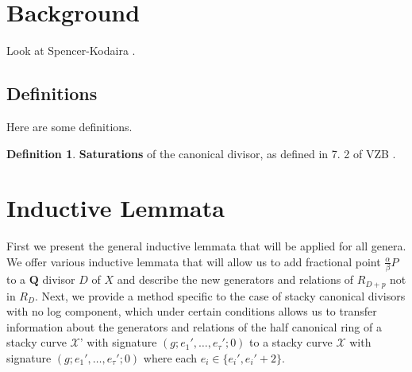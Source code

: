 \documentclass{amsart}
\theoremstyle{plain}
\theoremstyle{definition}
\newtheorem{defn}[thm]{Definition}
\theoremstyle{remark}
\numberwithin{equation}{section}
\newcommand \sx{\mathscr X}
\begin{document}












\section{Background}
Look at Spencer-Kodaira \cite{kodaira:complex-manifolds}.

\subsection{Definitions}
Here are some definitions.

\begin{defn}
\label{defn:sat}
\textbf{Saturations} of the canonical divisor, as defined in 7.
2 of VZB \cite{vzb:stacky}.
\end{defn}























\section{Inductive Lemmata}
First we present the general inductive lemmata that will be applied
for all genera.  We offer various inductive lemmata that will allow us to add fractional point $\frac{\alpha}{\beta}P$ to a $\mathbf{Q}$ divisor $D$ of $X$ and describe the new generators and relations of $R_{D+p}$ not in $R_D$.  Next, we provide a method specific to the case of stacky canonical divisors with no log component, which under certain conditions allows us to transfer information about the generators and relations of the half canonical ring of a stacky curve $\sx$' with signature $(g; e_1', \ldots, e_\tau'; 0)$ to a stacky curve $\sx$ with signature $(g; e_1', \ldots, e_\tau'; 0)$ where each $e_i\in \{e_i', e_i'+2\}$.    
\end{document}
